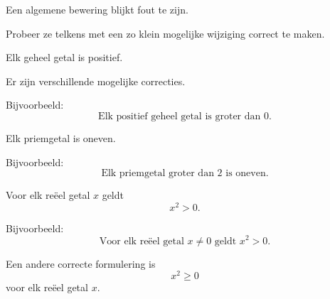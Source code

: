\documentclass{ximera}
\begin{document}
\begin{oefening}{\oefU \ESS}

Een algemene bewering blijkt fout te zijn.

Probeer ze telkens met een zo klein mogelijke wijziging correct te maken.

\begin{question}
Elk geheel getal is positief.

\begin{oplossing}
Er zijn verschillende mogelijke correcties.

Bijvoorbeeld:
\[
\text{Elk positief geheel getal is groter dan }0.
\]
\end{oplossing}
\end{question}


\begin{question}
Elk priemgetal is oneven.

\begin{oplossing}
Bijvoorbeeld:
\[
\text{Elk priemgetal groter dan }2\text{ is oneven.}
\]
\end{oplossing}
\end{question}


\begin{question}
Voor elk reëel getal $x$ geldt
\[
x^2>0.
\]

\begin{oplossing}
Bijvoorbeeld:
\[
\text{Voor elk reëel getal }x\neq0\text{ geldt }x^2>0.
\]

Een andere correcte formulering is
\[
x^2\geq0
\]
voor elk reëel getal $x$.
\end{oplossing}
\end{question}

\end{oefening}
\end{document}
